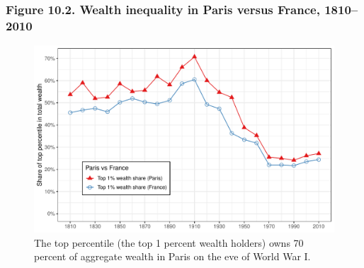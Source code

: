 \documentclass[t]{beamer}\usepackage[]{graphicx}\usepackage[]{color}
\newenvironment{knitrout}{}{} %
\begin{document}
\begin{frame}[label=Figure_10_2]
\frametitle{Figure 10.2. Wealth inequality in Paris versus France, 1810--2010}
\begin{figure}[t]
\begin{minipage}[b]{\textwidth}
\centering
\begin{knitrout}\footnotesize
{}\color{fgcolor}

{\centering \includegraphics[width=1\linewidth]{figures/color/Figure_10_2} 

}



\end{knitrout}
\caption{The top percentile (the top 1 percent wealth holders) owns 70 percent of aggregate wealth in Paris on the eve of World War I.}
\end{minipage}
\end{figure}
\end{frame}
\end{document}
